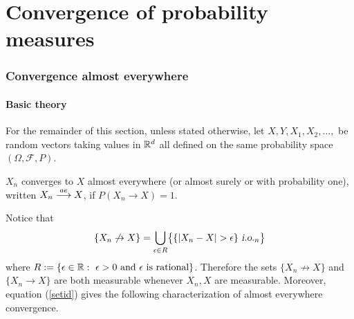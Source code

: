 \newcommand{\SlN}{S_n^{\text{\,\tiny$\leq\!\!N$}}}
\newcommand{\SgN}{S_n^{\text{\,\tiny$>\!\!N$}}}

%
%
\part{Convergence of probability measures}




%
%
\section{Convergence almost everywhere}


\subsection{Basic theory}


\begin{sectionassumption} For the remainder of this section, unless stated otherwise, let $X, Y, X_1, X_2, \ldots, $  be random vectors taking values in $\Bbb R^d$ all defined on the same probability space   $(\Omega, \mathcal F, P)$.
\end{sectionassumption}




\begin{definition}
 $X_n$ converges to $X$ almost everywhere (or almost surely or with probability one), written $X_n\overset{\small ae} \longrightarrow X$, if $P(X_n\rightarrow X) = 1$.
\end{definition}


Notice that 
\begin{equation}
\label{setid}
\{X_n \not\rightarrow X \} = \bigcup_{\epsilon \in R} \bigl\{\{|X_n - X| >\epsilon\} {\,\,\text{\sl i.o.} }_n \bigr\} 
\end{equation}
where $R:=\{ \epsilon\in \Bbb R: \text{ $\epsilon>0$ and $\epsilon$ is rational}\}$. Therefore the sets $\{X_n \not\rightarrow X \}$ and $\{X_n \rightarrow X \}$ are both measurable whenever $X_n, X$ are measurable. Moreover, equation (\ref{setid}) gives the following characterization of almost everywhere convergence.


